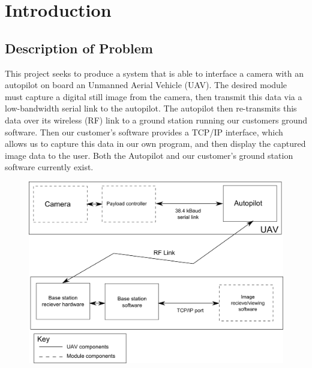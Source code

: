 \chapter{Introduction}

\section{Description of Problem}

This project seeks to produce a system that is able to interface a camera with an autopilot on board an Unmanned Aerial Vehicle (UAV). The desired module must capture a digital still image from the camera, then transmit this data via a low-bandwidth serial link to the autopilot. The autopilot then re-transmits this data over its wireless (RF) link to a ground station running our customers ground software. Then our customer's software provides a TCP/IP interface, which allows us to capture this data in our own program, and then display the captured image data to the user. Both the Autopilot and our customer's ground station software currently exist.

\begin{figure}[H]
        \centering
        \includegraphics[width=1.00\textwidth]{figures/spec_block_diagram_2.png}
        \label{fig:blockDiagram}
\end{figure}

